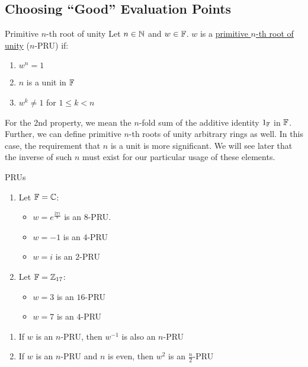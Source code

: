 \subsection{Choosing ``Good'' Evaluation Points}
\begin{definition}{Primitive $n$-th root of unity}{}
    Let $n \in \operatorname{\mathbb{N}}$ and $w \in \operatorname{\mathbb{F}}$. $w$ is a \ul{primitive $n$-th root of unity} ($n$-PRU) if:
    \begin{enumerate}
        \item $w^n = 1$
        \item $n$ is a unit in $\operatorname{\mathbb{F}}$
        \item $w^k \neq 1$ for $1 \leq k < n$
    \end{enumerate}
\end{definition}
\begin{remark}
    For the 2nd property, we mean the $n$-fold sum of the additive identity $1_{\operatorname{\mathbb{F}}}$ in $\operatorname{\mathbb{F}}$.
    Further, we can define primitive $n$-th roots of unity arbitrary rings as well.
    In this case, the requirement that $n$ is a unit is more significant.
    We will see later that the inverse of such $n$ must exist for our particular usage of these elements.
\end{remark}

\begin{example}{PRUs}{}
    \begin{enumerate}
        \item Let $\operatorname{\mathbb{F}} = \operatorname{\mathbb{C}}$:
        \begin{itemize}
            \item $w = e^{\frac{2\pi i}{8}}$ is an $8$-PRU.
            \item $w = -1$ is an $4$-PRU
            \item $w = i$ is an $2$-PRU
        \end{itemize}

        \item Let $\operatorname{\mathbb{F}} = \operatorname{\mathbb{Z}}_{17}$:
        \begin{itemize}
            \item $w = 3$ is an $16$-PRU
            \item $w = 7$ is an $4$-PRU
        \end{itemize}
    \end{enumerate}
\end{example}

\begin{proposition}{}{}
    \begin{enumerate}
        \item If $w$ is an $n$-PRU, then $w^{-1}$ is also an $n$-PRU
        \item If $w$ is an $n$-PRU and $n$ is even, then $w^2$ is an $\frac{n}{2}$-PRU
    \end{enumerate}
\end{proposition}

